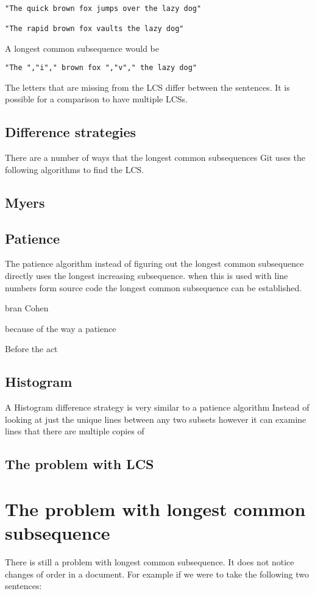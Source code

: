\begin{verbatim}

"The quick brown fox jumps over the lazy dog"

"The rapid brown fox vaults the lazy dog"

\end{verbatim}
A longest common subsequence would be
\begin{verbatim}
"The ","i"," brown fox ","v"," the lazy dog"
\end{verbatim}
The letters that are missing from the LCS differ between the sentences.
It is possible for a comparison to have multiple LCSs.

\subsection{Difference strategies}
There are a number of ways that the longest common subsequences
Git uses the following algorithms to find the LCS.

\subsection{Myers}


\subsection{Patience}
The patience algorithm instead of figuring out the longest common subsequence directly uses the longest increasing subsequence.
when this is used with line numbers form source code the longest common subsequence can be established.

bran Cohen

because of the way a patience 

Before the act

\subsection{Histogram}
A Histogram difference strategy is very similar to a patience algorithm
Instead of looking at just the unique lines between any two subsets however it can examine lines that there are multiple copies of 

\subsection{The problem with LCS}
\section{The problem with longest common subsequence}
There is still a problem with longest common subsequence. It does not notice changes of order in a document.  For example if we were to take the following two sentences:

